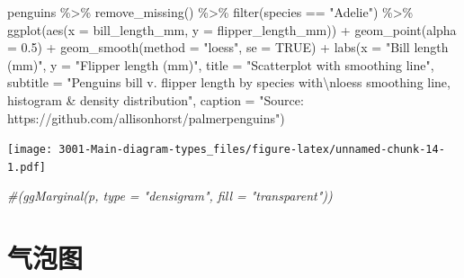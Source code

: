\documentclass[
]{book}
\newenvironment{Shaded}{\begin{snugshade}}{\end{snugshade}}
\newcommand{\AttributeTok}[1]{\textcolor[rgb]{0.77,0.63,0.00}{#1}}
\newcommand{\CommentTok}[1]{\textcolor[rgb]{0.56,0.35,0.01}{\textit{#1}}}
\newcommand{\ConstantTok}[1]{\textcolor[rgb]{0.00,0.00,0.00}{#1}}
\newcommand{\FloatTok}[1]{\textcolor[rgb]{0.00,0.00,0.81}{#1}}
\newcommand{\FunctionTok}[1]{\textcolor[rgb]{0.00,0.00,0.00}{#1}}
\newcommand{\NormalTok}[1]{#1}
\newcommand{\SpecialCharTok}[1]{\textcolor[rgb]{0.00,0.00,0.00}{#1}}
\newcommand{\StringTok}[1]{\textcolor[rgb]{0.31,0.60,0.02}{#1}}
\begin{document}
\begin{Shaded}
\begin{Highlighting}[]
\NormalTok{penguins }\SpecialCharTok{\%\textgreater{}\%}
  \FunctionTok{remove\_missing}\NormalTok{() }\SpecialCharTok{\%\textgreater{}\%}
  \FunctionTok{filter}\NormalTok{(species }\SpecialCharTok{==} \StringTok{"Adelie"}\NormalTok{) }\SpecialCharTok{\%\textgreater{}\%}
  \FunctionTok{ggplot}\NormalTok{(}\FunctionTok{aes}\NormalTok{(}\AttributeTok{x =}\NormalTok{ bill\_length\_mm, }\AttributeTok{y =}\NormalTok{ flipper\_length\_mm)) }\SpecialCharTok{+}
  \FunctionTok{geom\_point}\NormalTok{(}\AttributeTok{alpha =} \FloatTok{0.5}\NormalTok{) }\SpecialCharTok{+}
  \FunctionTok{geom\_smooth}\NormalTok{(}\AttributeTok{method =} \StringTok{"loess"}\NormalTok{, }\AttributeTok{se =} \ConstantTok{TRUE}\NormalTok{) }\SpecialCharTok{+}
    \FunctionTok{labs}\NormalTok{(}\AttributeTok{x =} \StringTok{"Bill length (mm)"}\NormalTok{, }
         \AttributeTok{y =} \StringTok{"Flipper length (mm)"}\NormalTok{,}
        \AttributeTok{title =} \StringTok{"Scatterplot with smoothing line"}\NormalTok{, }
        \AttributeTok{subtitle =} \StringTok{"Penguins bill v. flipper length by species with}\SpecialCharTok{\textbackslash{}n}\StringTok{loess smoothing line, histogram \& density distribution"}\NormalTok{,}
        \AttributeTok{caption =} \StringTok{"Source: https://github.com/allisonhorst/palmerpenguins"}\NormalTok{)}
\end{Highlighting}
\end{Shaded}

\texttt{[image: 3001-Main-diagram-types\_files/figure-latex/unnamed-chunk-14-1.pdf]}

\begin{Shaded}
\begin{Highlighting}[]
\CommentTok{\#(ggMarginal(p, type = "densigram", fill = "transparent"))}
\end{Highlighting}
\end{Shaded}

\hypertarget{ux6c14ux6ce1ux56fe}{%
\section{气泡图}\label{ux6c14ux6ce1ux56fe}}
\end{document}
